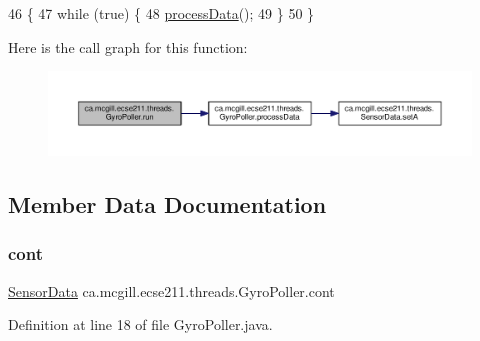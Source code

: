 \begin{DoxyCode}
46                     \{
47     \textcolor{keywordflow}{while} (\textcolor{keyword}{true}) \{
48       \hyperlink{classca_1_1mcgill_1_1ecse211_1_1threads_1_1_gyro_poller_a27f914ed77f23805210998fc0ee2daa7}{processData}();
49     \}
50   \}
\end{DoxyCode}
Here is the call graph for this function\+:
\nopagebreak
\begin{figure}[H]
\begin{center}
\leavevmode
\includegraphics[width=350pt]{classca_1_1mcgill_1_1ecse211_1_1threads_1_1_gyro_poller_a7a3232e355cece714fa85a3a902d9cfd_cgraph}
\end{center}
\end{figure}


\subsection{Member Data Documentation}
\mbox{\label{classca_1_1mcgill_1_1ecse211_1_1threads_1_1_gyro_poller_a90507a3d6038ff7ec7881640b5dd4263}} 
\subsubsection{\texorpdfstring{cont}{cont}}
{\footnotesize\ttfamily \hyperlink{classca_1_1mcgill_1_1ecse211_1_1threads_1_1_sensor_data}{Sensor\+Data} ca.\+mcgill.\+ecse211.\+threads.\+Gyro\+Poller.\+cont\hspace{0.3cm}{\ttfamily [protected]}}



Definition at line 18 of file Gyro\+Poller.\+java.

\mbox{\label{classca_1_1mcgill_1_1ecse211_1_1threads_1_1_gyro_poller_a181979440aafff52b0ba5aaff9064f80}} 
